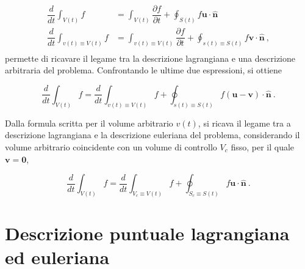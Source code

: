 \begin{equation}
\begin{aligned}
  \dfrac{d}{d t} \int_{V(t)} f & = \int_{V(t)} \dfrac{\partial f}{\partial t} +
  \oint_{S(t)} f\bm{u} \cdot \bm{\hat{n}}  \\
  \dfrac{d}{d t} \int_{v(t)\equiv V(t)} f & = \int_{v(t)\equiv V(t)} \dfrac{\partial f}{\partial t} +
  \oint_{s(t)\equiv S(t)} f\bm{v} \cdot \bm{\hat{n}}  \ , \\
\end{aligned}
\end{equation}
permette di ricavare il legame tra la descrizione lagrangiana e una descrizione arbitraria del problema. Confrontando le ultime due espressioni, si ottiene
\begin{fBox}
\begin{equation}
 \dfrac{d}{d t} \int_{V(t)} f = \dfrac{d}{d t} \int_{v(t)\equiv V(t)} f +
 \oint_{s(t)\equiv S(t)} f (\bm{u} - \bm{v}) \cdot \bm{\hat{n}} \ . 
\end{equation}
\end{fBox}
Dalla formula scritta per il volume arbitrario $v(t)$, si ricava il legame tra a descrizione lagrangiana e la descrizione euleriana del problema, considerando il volume arbitrario coincidente con un volume di controllo $V_c$ fisso, per il quale $\bm{v}=\bm{0}$,
\begin{fBox}
\begin{equation}
 \dfrac{d}{d t} \int_{V(t)} f = \dfrac{d}{d t} \int_{V_c\equiv V(t)} f +
 \oint_{S_c\equiv S(t)} f \bm{u} \cdot \bm{\hat{n}} \ .
\end{equation}
\end{fBox}

\section{Descrizione puntuale lagrangiana ed euleriana}



